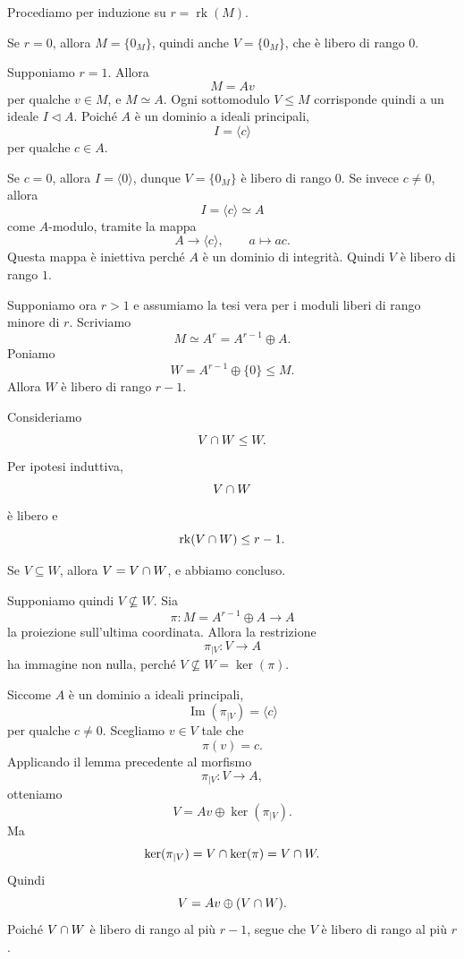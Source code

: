 \documentclass[a4paper]{article}
\begin{document}
\begin{radioactive}
\begin{snippetproof}{}
    Procediamo per induzione su \(r=\operatorname{rk}(M)\).

    Se \(r=0\), allora \(M=\{0_M\}\), quindi anche \(V=\{0_M\}\), che è libero di rango \(0\).

    Supponiamo \(r=1\). Allora
    \[
        M=Av
    \]
    per qualche \(v\in M\), e \(M\simeq A\). Ogni sottomodulo \(V\leq M\) corrisponde quindi a un ideale \(I\triangleleft A\). Poiché \(A\) è un dominio a ideali principali,
    \[
        I=\langle c \rangle
    \]
    per qualche \(c\in A\).

    Se \(c=0\), allora \(I=\langle 0 \rangle\), dunque \(V=\{0_M\}\) è libero di rango \(0\). Se invece \(c\neq 0\), allora
    \[
        I=\langle c \rangle\simeq A
    \]
    come \(A\)-modulo, tramite la mappa
    \[
        A\to \langle c \rangle,
        \qquad
        a\mapsto ac.
    \]
    Questa mappa è iniettiva perché \(A\) è un dominio di integrità. Quindi \(V\) è libero di rango \(1\).

    Supponiamo ora \(r>1\) e assumiamo la tesi vera per i moduli liberi di rango minore di \(r\).
    Scriviamo
    \[
        M\simeq A^r=A^{r-1}\oplus A.
    \]
    Poniamo
    \[
        W=A^{r-1}\oplus \{0\}\leq M.
    \]
    Allora \(W\) è libero di rango \(r-1\).

    Consideriamo
    \[
        V\cap W\leq W.
    \]
    Per ipotesi induttiva,
    \[
        V\cap W
    \]
    è libero e
    \[
        \operatorname{rk}(V\cap W)\leq r-1.
    \]

    Se \(V\subseteq W\), allora \(V=V\cap W\), e abbiamo concluso.

    Supponiamo quindi \(V\nsubseteq W\). Sia
    \[
        \pi\colon M=A^{r-1}\oplus A\to A
    \]
    la proiezione sull'ultima coordinata. Allora la restrizione
    \[
        \pi_{|V}\colon V\to A
    \]
    ha immagine non nulla, perché \(V\nsubseteq W=\ker(\pi)\).

    Siccome \(A\) è un dominio a ideali principali,
    \[
        \operatorname{Im}(\pi_{|V})=\langle c \rangle
    \]
    per qualche \(c\neq 0\). Scegliamo \(v\in V\) tale che
    \[
        \pi(v)=c.
    \]
    Applicando il lemma precedente al morfismo
    \[
        \pi_{|V}\colon V\to A,
    \]
    otteniamo
    \[
        V=Av\oplus \ker(\pi_{|V}).
    \]
    Ma
    \[
        \ker(\pi_{|V})=V\cap \ker(\pi)=V\cap W.
    \]
    Quindi
    \[
        V=Av\oplus (V\cap W).
    \]
    Poiché \(V\cap W\) è libero di rango al più \(r-1\), segue che \(V\) è libero di rango al più \(r\).
\end{snippetproof}
\end{radioactive}
\end{document}
